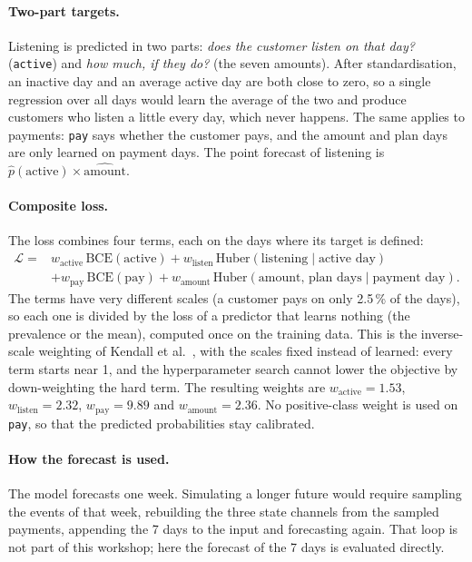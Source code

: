 \documentclass{article}
\begin{document}
\paragraph{Two-part targets.} Listening is predicted in two parts: \emph{does the customer listen on that day?} (\texttt{active}) and \emph{how much, if they do?} (the seven amounts). After standardisation, an inactive day and an average active day are both close to zero, so a single regression over all days would learn the average of the two and produce customers who listen a little every day, which never happens. The same applies to payments: \texttt{pay} says whether the customer pays, and the amount and plan days are only learned on payment days. The point forecast of listening is $\hat p(\text{active}) \times \widehat{\text{amount}}$.

\paragraph{Composite loss.} The loss combines four terms, each on the days where its target is defined:
\begin{equation}
\begin{aligned}
\mathcal{L} = {} & w_{\text{active}}\, \text{BCE}(\text{active})
+ w_{\text{listen}}\, \text{Huber}(\text{listening} \mid \text{active day}) \\
& + w_{\text{pay}}\, \text{BCE}(\text{pay})
+ w_{\text{amount}}\, \text{Huber}(\text{amount, plan days} \mid \text{payment day}).
\end{aligned}
\end{equation}
The terms have very different scales (a customer pays on only 2.5\,\% of the days), so each one is divided by the loss of a predictor that learns nothing (the prevalence or the mean), computed once on the training data. This is the inverse-scale weighting of Kendall et al.\ \cite{kendall2018}, with the scales fixed instead of learned: every term starts near 1, and the hyperparameter search cannot lower the objective by down-weighting the hard term. The resulting weights are $w_{\text{active}} = 1.53$, $w_{\text{listen}} = 2.32$, $w_{\text{pay}} = 9.89$ and $w_{\text{amount}} = 2.36$. No positive-class weight is used on \texttt{pay}, so that the predicted probabilities stay calibrated.

\paragraph{How the forecast is used.} The model forecasts one week. Simulating a longer future would require sampling the events of that week, rebuilding the three state channels from the sampled payments, appending the 7 days to the input and forecasting again. That loop is not part of this workshop; here the forecast of the 7 days is evaluated directly.
\end{document}
